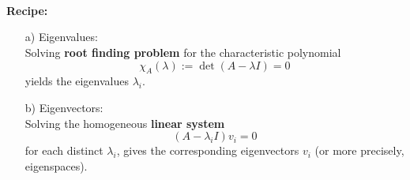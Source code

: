 \begin{frame}
~\\
~\\~\\
\textbf{ Recipe:}
	 \begin{itemize}
	\item[a)] Eigenvalues:\\
	 Solving \textbf{\color{cyan}root finding problem} for the characteristic polynomial
	$$\chi_A(\lambda) := \det (A-\lambda I) = 0 $$  yields the eigenvalues $\lambda_i$.
	\vspace{0.6cm}\item[b)] Eigenvectors:\\
	Solving the homogeneous \textbf{\color{orange}linear system}
	$$(A - \lambda_i I)v_i = 0$$ 
	for each distinct  $\lambda_i$, gives the corresponding eigenvectors $v_i$ (or more precisely, eigenspaces).
\end{itemize}
\end{frame}


